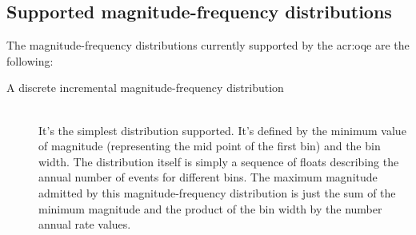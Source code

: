 \subsection{Supported magnitude-frequency distributions}
The magnitude-frequency distributions currently supported by the 
\gls{acr:oqe} are the following:
\begin{description}
    \item[A discrete incremental magnitude-frequency distribution] \hfill \\
    It's the simplest distribution supported. It's defined by the 
    minimum value of magnitude (representing the mid point of the first
    bin) and the bin width. 
    The distribution itself is simply a sequence of floats describing the 
    annual number of events for different bins. The maximum magnitude 
    admitted by this magnitude-frequency distribution is just the sum of 
    the minimum magnitude and the product of the bin width by the number 
    annual rate values.


\end{description}
